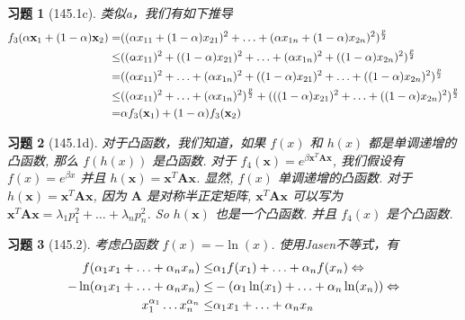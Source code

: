 \documentclass[a4paper, UTF8]{ctexart}
\newtheorem*{exercise}{\textbf{习题}}
\begin{document}
	\begin{exercise}[145.1c]
		类似a，我们有如下推导
		\begin{equation}
		\notag
		\begin{split}
		f_3(\alpha \mathbf{x}_1 + (1 - \alpha) \mathbf{x}_2) = & ((\alpha x_{11} + (1 - \alpha) x_{21})^2 + \ldots + (\alpha x_{1n} + (1 - \alpha) x_{2n})^2)^{\frac{p}{2}} \\
		\leq & ((\alpha x_{11})^2 + ((1 - \alpha) x_{21})^2 + \ldots + (\alpha x_{1n})^2 + ((1 - \alpha) x_{2n})^2)^{\frac{p}{2}} \\
		= & ((\alpha x_{11})^2 + \ldots + (\alpha x_{1n})^2 + ((1 - \alpha) x_{21})^2 + \ldots + ((1 - \alpha) x_{2n})^2)^{\frac{p}{2}} \\
		\leq & ((\alpha x_{11})^2 + \ldots + (\alpha x_{1n})^2)^{\frac{p}{2}} + (((1 - \alpha) x_{21})^2 + \ldots + ((1 - \alpha) x_{2n})^2)^{\frac{p}{2}} \\
		= & \alpha f_3(\mathbf{x}_1) + (1 - \alpha) f_3(\mathbf{x}_2)
		\end{split}
		\end{equation}
	\end{exercise}

	\begin{exercise}[145.1d]
		对于凸函数，我们知道，如果 $f(x)$ 和 $h(x)$ 都是单调递增的凸函数, 那么 $f(h(x))$ 是凸函数. 对于 $f_4(\mathbf{x}) = e^{\beta \mathbf{x}^T\mathbf{Ax}}$, 我们假设有 $f(x) = e^{\beta x}$ 并且 $h(\mathbf{x}) = \mathbf{x}^T\mathbf{Ax}$. 显然, $f(x)$ 单调递增的凸函数. 对于 $h(\mathbf{x}) = \mathbf{x}^T\mathbf{Ax}$, 因为 $\mathbf{A}$ 是对称半正定矩阵, $\mathbf{x}^T\mathbf{Ax}$ 可以写为 $\mathbf{x}^T\mathbf{Ax} = \lambda_1 p_1^2 + \ldots + \lambda_n p_n^2$. So $h(\mathbf{x})$ 也是一个凸函数. 并且 $f_4(x)$ 是个凸函数.
	\end{exercise}

	\begin{exercise}[145.2]
		考虑凸函数 $f(x) = - \ln (x)$. 使用Jasen不等式，有
		\begin{equation}
		\notag
		\begin{split}
		f(\alpha_1 x_1 + \ldots + \alpha_n x_n) \leq & \alpha_1 f(x_1) + \ldots + \alpha_n f(x_n) \Leftrightarrow \\
		- \ln(\alpha_1 x_1 + \ldots + \alpha_n x_n) \leq &  - (\alpha_1 \ln(x_1) + \ldots + \alpha_n \ln(x_n)) \Leftrightarrow \\
		x_1^{\alpha_1} \ldots x_n^{\alpha_n} \leq  & \alpha_1 x_1 + \ldots + \alpha_n x_n
		\end{split}
		\end{equation}
	\end{exercise}
\end{document}
